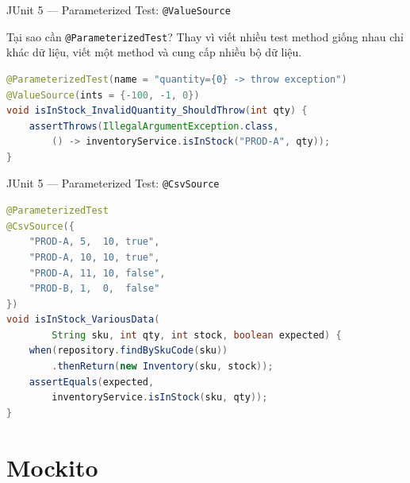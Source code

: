 \documentclass[aspectratio=169,12pt]{beamer}
\begin{document}
\begin{frame}[fragile,shrink=12]{JUnit 5 --- Parameterized Test: \texttt{@ValueSource}}
  \begin{block}{Tại sao cần \texttt{@ParameterizedTest}?}
    Thay vì viết nhiều test method giống nhau chỉ khác dữ liệu,
    viết một method và cung cấp nhiều bộ dữ liệu.
  \end{block}

\begin{lstlisting}[language=java]
@ParameterizedTest(name = "quantity={0} -> throw exception")
@ValueSource(ints = {-100, -1, 0})
void isInStock_InvalidQuantity_ShouldThrow(int qty) {
    assertThrows(IllegalArgumentException.class,
        () -> inventoryService.isInStock("PROD-A", qty));
}
\end{lstlisting}
\end{frame}

\begin{frame}[fragile,shrink=12]{JUnit 5 --- Parameterized Test: \texttt{@CsvSource}}
\begin{lstlisting}[language=java]
@ParameterizedTest
@CsvSource({
    "PROD-A, 5,  10, true",
    "PROD-A, 10, 10, true",
    "PROD-A, 11, 10, false",
    "PROD-B, 1,  0,  false"
})
void isInStock_VariousData(
        String sku, int qty, int stock, boolean expected) {
    when(repository.findBySkuCode(sku))
        .thenReturn(new Inventory(sku, stock));
    assertEquals(expected,
        inventoryService.isInStock(sku, qty));
}
\end{lstlisting}
\end{frame}

\section{Mockito}
\end{document}

